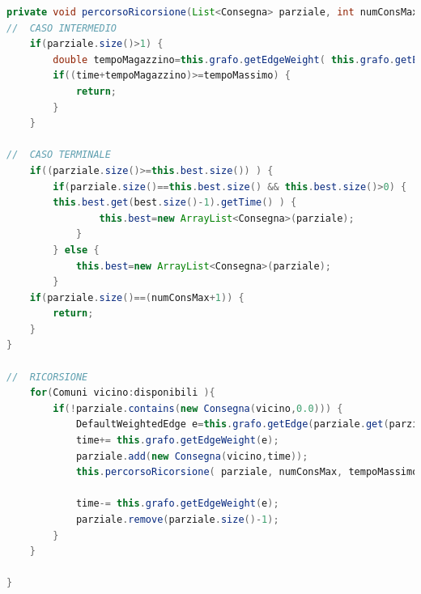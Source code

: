 \documentclass[a4paper,12pt]{report}
\begin{document}
\begin{center}
\begin{lstlisting}[caption={Metodo percorsoRicorsione() della classe Model},  label={lst:percorsoRicorsione},captionpos=b, language=Java]
private void percorsoRicorsione(List<Consegna> parziale, int numConsMax, double tempoMassimo, List<Comuni> disponibili, double time) {
//	CASO INTERMEDIO
	if(parziale.size()>1) {
		double tempoMagazzino=this.grafo.getEdgeWeight( this.grafo.getEdge( parziale.get( parziale.size()-1 ).getComune(),this.magazzino)  );
		if((time+tempoMagazzino)>=tempoMassimo) {
			return;
		}
	}
	
//	CASO TERMINALE 
	if((parziale.size()>=this.best.size()) ) {
		if(parziale.size()==this.best.size() && this.best.size()>0) {	if(parziale.get(parziale.size()-1).getTime()<=
		this.best.get(best.size()-1).getTime() ) {
				this.best=new ArrayList<Consegna>(parziale);
			}
		} else {
			this.best=new ArrayList<Consegna>(parziale);
		}
	if(parziale.size()==(numConsMax+1)) {
		return;
	}
}
	
//	RICORSIONE
	for(Comuni vicino:disponibili ){
		if(!parziale.contains(new Consegna(vicino,0.0))) {
			DefaultWeightedEdge e=this.grafo.getEdge(parziale.get(parziale.size()-1).getComune(), vicino);
			time+= this.grafo.getEdgeWeight(e);
			parziale.add(new Consegna(vicino,time));
			this.percorsoRicorsione( parziale, numConsMax, tempoMassimo, disponibili, time);
			
			time-= this.grafo.getEdgeWeight(e);
			parziale.remove(parziale.size()-1);
		}
	}

}
\end{lstlisting}
\end{center}
\end{document}
